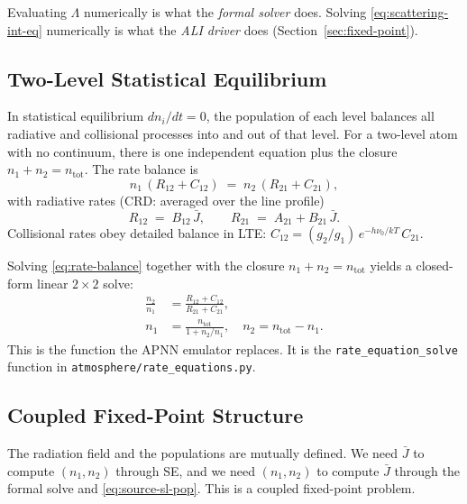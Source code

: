 \documentclass[11pt]{article}
\newcommand{\Lop}{\Lambda}
\newcommand{\Jbar}{\bar{J}}
\newcommand{\code}[1]{\texttt{#1}}
\begin{document}
Evaluating $\Lop$ numerically is what the \emph{formal solver} does.
Solving \eqref{eq:scattering-int-eq} numerically is what the
\emph{ALI driver} does (Section~\ref{sec:fixed-point}).

\subsection{Two-Level Statistical Equilibrium}
\label{sec:se-equations}

In statistical equilibrium $dn_i/dt = 0$, the population of each level
balances all radiative and collisional processes into and out of that
level.  For a two-level atom with no continuum, there is one
independent equation plus the closure $n_1 + n_2 = n_{\mathrm{tot}}$.
The rate balance is
\begin{equation}
n_1 \,(R_{12} + C_{12}) \;=\; n_2 \,(R_{21} + C_{21}),
\label{eq:rate-balance}
\end{equation}
with radiative rates (CRD: averaged over the line profile)
\begin{equation}
R_{12} \;=\; B_{12}\,\Jbar, \qquad
R_{21} \;=\; A_{21} + B_{21}\,\Jbar.
\label{eq:radiative-rates}
\end{equation}
Collisional rates obey detailed balance in LTE:
$C_{12} = (g_2/g_1)\,e^{-h\nu_0/kT}\, C_{21}$.

Solving \eqref{eq:rate-balance} together with the closure
$n_1 + n_2 = n_{\mathrm{tot}}$ yields a closed-form linear $2\times 2$ solve:
\begin{align}
\frac{n_2}{n_1} &= \frac{R_{12} + C_{12}}{R_{21} + C_{21}}, \label{eq:n2-over-n1}\\
n_1 &= \frac{n_{\mathrm{tot}}}{1 + n_2/n_1}, \quad n_2 = n_{\mathrm{tot}} - n_1.
\nonumber
\end{align}
This is the function the APNN emulator replaces.  It is the
\code{rate\_equation\_solve} function in
\code{atmosphere/rate\_equations.py}.

\subsection{Coupled Fixed-Point Structure}
\label{sec:fixed-point-structure}

The radiation field and the populations are mutually defined.  We
need $\Jbar$ to compute $(n_1, n_2)$ through SE, and we need $(n_1,
n_2)$ to compute $\Jbar$ through the formal solve and
\eqref{eq:source-sl-pop}.  This is a coupled fixed-point problem.
\end{document}

